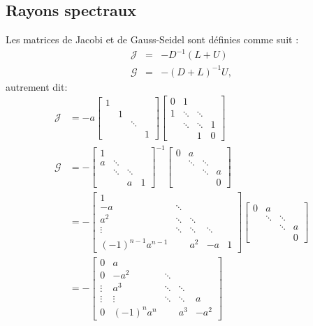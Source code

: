 \subsection{Rayons spectraux}
Les matrices de Jacobi et de Gauss-Seidel sont définies comme suit :
\begin{eqnarray}
  \mathcal{J} &=& -D^{-1}(L+U)\\
  \mathcal{G} &=& -(D+L)^{-1}U,
\end{eqnarray}
autrement dit:
\begin{align*}
  \mathcal{J} & = - a
  \begin{bmatrix}
    1 & & &\\
      & 1 & &\\
      & & \ddots & \\
      & & & 1
  \end{bmatrix}
  \begin{bmatrix}
    0 & 1& &\\
    1 & \ddots & \ddots &\\
      & \ddots & \ddots & 1 \\
      & & 1 & 0
  \end{bmatrix}\\
  \mathcal{G} & = -
  \begin{bmatrix}
    1 & & &\\
    a & \ddots &  &\\
      & \ddots & \ddots  &  \\
      & & a & 1
  \end{bmatrix} ^{-1}
  \begin{bmatrix}
    0 & a & &\\
      & \ddots &  \ddots &\\
      &  & \ddots  & a \\
      & &  & 0
  \end{bmatrix}
  \\
  & = -
  \begin{bmatrix}
    1 & & & &\\
    -a & \ddots &  & &\\
    a^2 & \ddots & \ddots  &  &\\
    \vdots & \ddots & \ddots & \ddots & \\
    (-1)^{n-1}a^{n-1} & & a^2 & -a & 1
  \end{bmatrix}
  \begin{bmatrix}
    0 & a & &\\
      & \ddots &  \ddots &\\
      &  & \ddots  & a \\
      & &  & 0
  \end{bmatrix}\\
  & = -
  \begin{bmatrix}
    0 & a & & &\\
    0 & -a^2 & \ddots  & &\\
    \vdots & a^3 & \ddots & \ddots  &\\
    \vdots & \vdots & \ddots & \ddots  & a \\
    0 & (-1)^n a^n & & a^3 & -a^2
  \end{bmatrix}
\end{align*}

